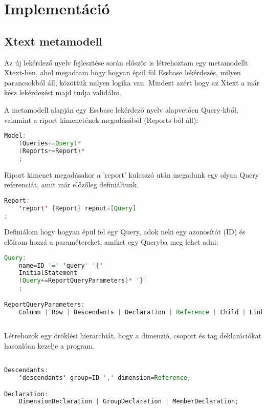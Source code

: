 \chapter{Implementáció}\label{sect:Ellaboration}
\section{Xtext metamodell}
Az új lekérdező nyelv fejlesztése során először is létrehoztam egy metamodellt Xtext-ben, ahol megadtam hogy hogyan épül föl Essbase lekérdezés, milyen parancsokból áll, közöttük milyen logika van. Mindezt azért hogy az Xtext a már kész lekérdezést majd tudja validálni.

A metamodell alapján egy Essbase lekérdező nyelv alapvetően Query-kből, valamint a riport kimenetének megadásából (Reports-ból áll):

\begin{lstlisting}[language=java,morekeywords={generate,dim,group,row,link,reportParameter,report,query},alsoletter={-},breaklines=true]
Model:
	(Queries+=Query)*
	(Reports+=Report)*
	;
\end{lstlisting}

Riport kimenet megadásakor a 'report' kulcsszó után megadunk egy olyan Query referenciát, amit már előzőleg definiáltunk.

\begin{lstlisting}[language=java,morekeywords={generate,dim,group,row,link,reportParameter,report,query},alsoletter={-},breaklines=true]
Report:
	'report' {Report} repout=[Query]
;
\end{lstlisting}

Definiálom hogy hogyan épül fel egy Query, adok neki egy azonosítót (ID) és előírom hozzá a paramétereket, amiket egy Queryba meg lehet adni:

\begin{lstlisting}[language=java,morekeywords={generate,dim,group,row,link,reportParameter,report,query},alsoletter={-},breaklines=true]
Query:
	name=ID '=' 'query' '{'
	InitialStatement
	(Query+=ReportQueryParameters)* '}'
	;

ReportQueryParameters:
	Column | Row | Descendants | Declaration | Reference | Child | Link | ReportParameter;
	
\end{lstlisting}

Létrehozok egy öröklési hierarchiát, hogy a dimenzió, csoport és tag deklarációkat hasonlóan kezelje a program.
\begin{lstlisting}[language=java,morekeywords={generate,dim,group,row,link,reportParameter,report,query},alsoletter={-},breaklines=true]

Descendants:
	'descendants' group=ID ',' dimension=Reference;

Declaration:
	DimensionDeclaration | GroupDeclaration | MemberDeclaration;
\end{lstlisting}


